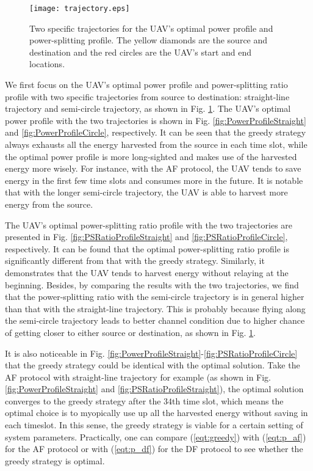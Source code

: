 \documentclass[12pt, draftclsnofoot, onecolumn]{IEEEtran}
\begin{document}
\begin{figure}
\centering
 \texttt{[image: trajectory.eps]}
\caption{Two specific trajectories for the UAV's optimal power profile and power-splitting profile. The yellow diamonds are the source and destination and the red circles are the UAV's start and end locations.}
\label{fig:trajectory}
\vspace*{-0.15in}
\end{figure}

We first focus on the UAV's optimal power profile and power-splitting ratio profile with two specific trajectories from source to destination: straight-line trajectory and semi-circle trajectory, as shown in Fig. \ref{fig:trajectory}. The UAV's optimal power profile with the two trajectories is shown in Fig. \ref{fig:PowerProfileStraight} and \ref{fig:PowerProfileCircle}, respectively. It can be seen that the greedy strategy always exhausts all the energy harvested from the source in each time slot, while the optimal power profile is more long-sighted and makes use of the harvested energy more wisely. For instance, with the AF protocol, the UAV tends to save energy in the first few time slots and consumes more in the future. It is notable that with the longer semi-circle trajectory, the UAV is able to harvest more energy from the source.

The UAV's optimal power-splitting ratio profile with the two trajectories are presented in Fig. \ref{fig:PSRatioProfileStraight} and \ref{fig:PSRatioProfileCircle}, respectively. It can be found that the optimal power-splitting ratio profile is significantly different from that with the greedy strategy. Similarly, it demonstrates that the UAV tends to harvest energy without relaying at the beginning. Besides, by comparing the results with the two trajectories, we find that the power-splitting ratio with the semi-circle trajectory is in general higher than that with the straight-line trajectory. This is probably because flying along the semi-circle trajectory leads to better channel condition due to higher chance of getting closer to either source or destination, as shown in Fig. \ref{fig:trajectory}.	

It is also noticeable in Fig. \ref{fig:PowerProfileStraight}-\ref{fig:PSRatioProfileCircle} that the greedy strategy could be identical with the optimal solution. Take the AF protocol with straight-line trajectory for example (as shown in Fig. \ref{fig:PowerProfileStraight} and \ref{fig:PSRatioProfileStraight}), the optimal solution converges to the greedy strategy after the $34$th time slot, which means the optimal choice is to myopically use up all the harvested energy without saving in each timeslot. In this sense, the greedy strategy is viable for a certain setting of system parameters. Practically, one can compare (\ref{eqt:greedy}) with (\ref{eqt:p_af}) for the AF protocol or with (\ref{eqt:p_df}) for the DF protocol to see whether the greedy strategy is optimal.
\end{document}
